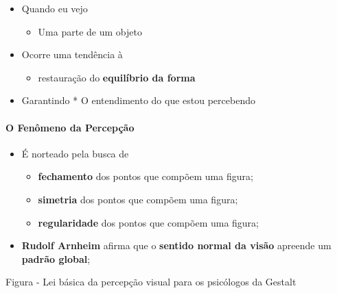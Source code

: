 \documentclass[
]{book}
\providecommand{\tightlist}{%
  \setlength{\itemsep}{0pt}\setlength{\parskip}{0pt}}
\begin{document}
\begin{itemize}
\tightlist
\item
  Quando eu vejo

  \begin{itemize}
  \tightlist
  \item
    Uma parte de um objeto
  \end{itemize}
\item
  Ocorre uma tendência à

  \begin{itemize}
  \tightlist
  \item
    restauração do \textbf{equilíbrio da forma}
  \end{itemize}
\item
  Garantindo * O entendimento do que estou percebendo
\end{itemize}

\hypertarget{o-fenuxf4meno-da-percepuxe7uxe3o}{%
\paragraph{O Fenômeno da
Percepção}\label{o-fenuxf4meno-da-percepuxe7uxe3o}}

\begin{itemize}
\tightlist
\item
  É norteado pela busca de

  \begin{itemize}
  \tightlist
  \item
    \textbf{fechamento} dos pontos que compõem uma figura;
  \item
    \textbf{simetria} dos pontos que compõem uma figura;
  \item
    \textbf{regularidade} dos pontos que compõem uma figura;
  \end{itemize}
\item
  \textbf{Rudolf Arnheim} afirma que o \textbf{sentido normal da visão}
  apreende um \textbf{padrão global};
\end{itemize}

Figura - Lei básica da percepção visual para os psicólogos da Gestalt
\end{document}
